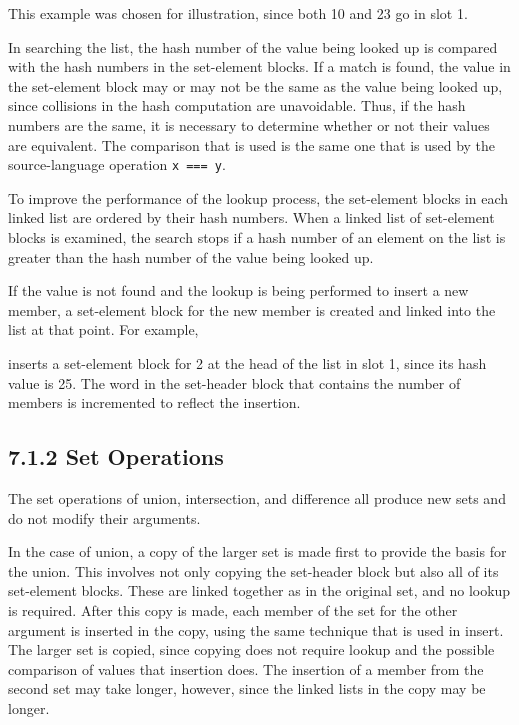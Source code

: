 This example was chosen for illustration, since both 10 and 23 go in slot 1.

In searching the list, the hash number of the value being looked up is
compared with the hash numbers in the set-element blocks. If a match
is found, the value in the set-element block may or may not be the same
as the value being looked up, since collisions in the hash computation
are unavoidable. Thus, if the hash numbers are the same, it is
necessary to determine whether or not their values are equivalent. The
comparison that is used is the same one that is used by the
source-language operation \texttt{x === y}.

To improve the performance of the lookup process, the set-element
blocks in each linked list are ordered by their hash numbers. When a
linked list of set-element blocks is examined, the search stops if a
hash number of an element on the list is greater than the hash number
of the value being looked up.

If the value is not found and the lookup is being performed to insert
a new member, a set-element block for the new member is created and
linked into the list at that point. For example,


\noindent inserts a set-element block for 2 at the head of the list
in slot 1, since its hash value is 25. The word in the set-header
block that contains the number of members is incremented to reflect
the insertion.

\subsection[7.1.2 Set Operations]{7.1.2 Set Operations}

The set operations of union, intersection, and difference all produce
new sets and do not modify their arguments.


In the case of union, a copy of the larger set is made first to
provide the basis for the union. This involves not only copying the
set-header block but also all of its set-element blocks. These are
linked together as in the original set, and no lookup is
required. After this copy is made, each member of the set for the
other argument is inserted in the copy, using the same technique that
is used in insert. The larger set is copied, since copying does not
require lookup and the possible comparison of values that insertion
does. The insertion of a member from the second set may take longer,
however, since the linked lists in the copy may be longer.

